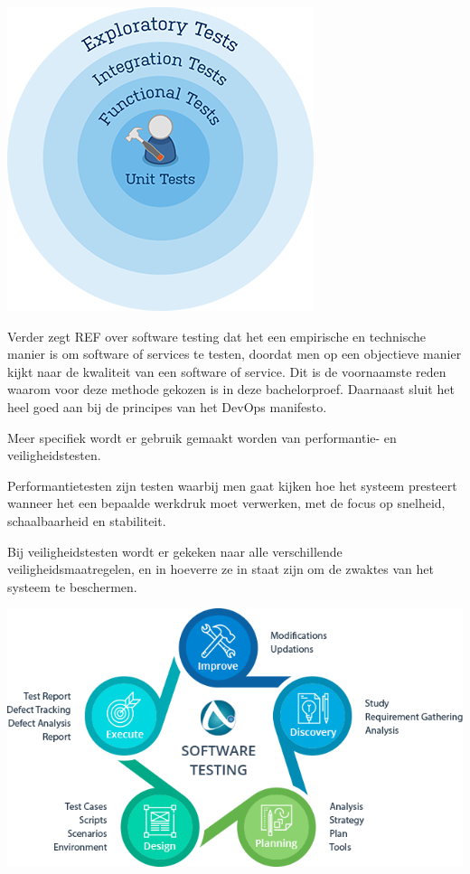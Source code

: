 \begin{center}
	\includegraphics[scale=0.5]{img/testing.png}
\end{center}

Verder zegt REF over software testing dat het een empirische en technische manier is om software of services te testen, doordat men op een objectieve manier kijkt naar de kwaliteit van een software of service. Dit is de voornaamste reden waarom voor deze methode gekozen is in deze bachelorproef. Daarnaast sluit het heel goed aan bij de principes van het DevOps manifesto.

Meer specifiek wordt er gebruik gemaakt worden van performantie- en veiligheidstesten.

Performantietesten zijn testen waarbij men gaat kijken hoe het systeem presteert wanneer het een bepaalde werkdruk moet verwerken, met de focus op snelheid, schaalbaarheid en stabiliteit.

Bij veiligheidstesten wordt er gekeken naar alle verschillende veiligheidsmaatregelen, en in hoeverre ze in staat zijn om de zwaktes van het systeem te beschermen.

\begin{center}
	\includegraphics[scale=0.5]{img/testingprocess.png}
\end{center}

